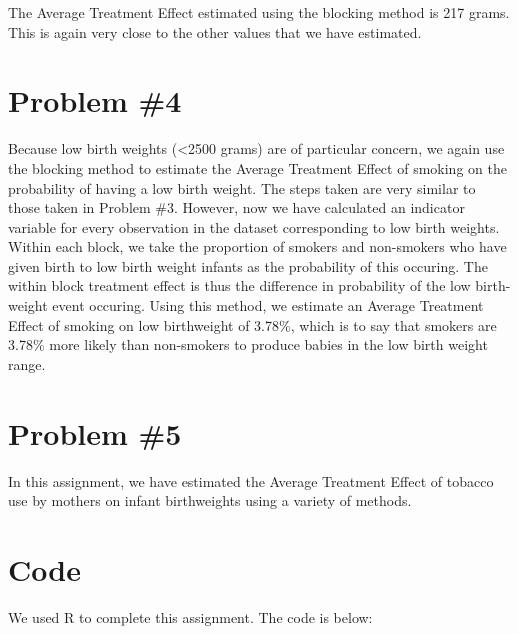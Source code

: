 \documentclass[letterpaper, 12pt]{article}
\begin{document}
The Average Treatment Effect estimated using the blocking method is 217 grams. This is again very close to the other values that we have estimated.

\section{Problem \#4}
Because low birth weights (<2500 grams) are of particular concern, we again use the blocking method to estimate the Average Treatment Effect of smoking on the probability of having a low birth weight. The steps taken are very similar to those taken in Problem \#3. However, now we have calculated an indicator variable for every observation in the dataset corresponding to low birth weights. Within each block, we take the proportion of smokers and non-smokers who have given birth to low birth weight infants as the probability of this occuring. The within block treatment effect is thus the difference in probability of the low birth-weight event occuring. Using this method, we estimate an Average Treatment Effect of smoking on low birthweight of 3.78\%, which is to say that smokers are 3.78\% more likely than non-smokers to produce babies in the low birth weight range.

\section{Problem \#5}
In this assignment, we have estimated the Average Treatment Effect of tobacco use by mothers on infant birthweights using a variety of methods. 

\section{Code}
We used R to complete this assignment.  The code is below:




\newpage
\thispagestyle{empty}
\mbox{}
\end{document}
